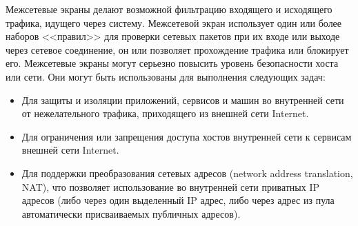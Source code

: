 Межсетевые экраны делают возможной фильтрацию входящего и исходящего
трафика, идущего через систему. Межсетевой экран использует один или
более наборов <<правил>> для проверки сетевых пакетов при их входе или
выходе через сетевое соединение, он или позволяет прохождение трафика
или блокирует его. Межсетевые экраны могут серьезно повысить уровень
безопасности хоста или сети. Они могут быть использованы для
выполнения следующих задач:

\begin{itemize}
\item  Для защиты и изоляции приложений, сервисов и машин во
    внутренней сети от нежелательного трафика, приходящего из внешней
    сети Internet.
\item  Для ограничения или запрещения доступа хостов внутренней
    сети к сервисам внешней сети Internet.
\item Для поддержки преобразования сетевых адресов (network
    address translation, NAT), что позволяет использование во
    внутренней сети приватных IP адресов (либо через один выделенный
    IP адрес, либо через адрес из пула автоматически присваиваемых
    публичных адресов).
\end{itemize}




\clearpage


